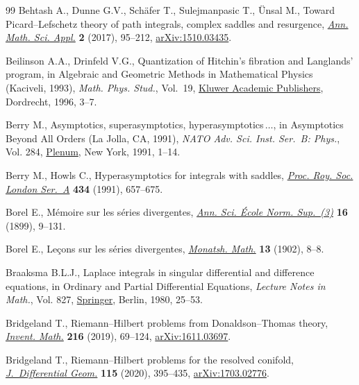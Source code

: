 \begin{thebibliography}{99}
Behtash A., Dunne G.V., Sch\"afer T., Sulejmanpasic T., \"Unsal M., Toward
 {P}icard--{L}efschetz theory of path integrals, complex saddles and
 resurgence, \href{https://doi.org/10.4310/AMSA.2017.v2.n1.a3}{\textit{Ann.
 Math. Sci. Appl.}} \textbf{2} (2017), 95--212,
 \href{http://arxiv.org/abs/1510.03435}{arXiv:1510.03435}.

Beilinson A.A., Drinfeld V.G., Quantization of {H}itchin's fibration and
 {L}anglands' program, in Algebraic and {G}eometric {M}ethods in
 {M}athematical {P}hysics ({K}aciveli, 1993), \textit{Math. Phys. Stud.},
 Vol.~19, \href{https://doi.org/10.1007/978-94-017-0693-3_1}{Kluwer Academic
 Publishers}, Dordrecht, 1996, 3--7.

Berry M., Asymptotics, superasymptotics, hyperasymptotics{$\,\dots$}, in
 Asymptotics {B}eyond {A}ll {O}rders ({L}a {J}olla, {CA}, 1991), \textit{NATO
 Adv. Sci. Inst. Ser.~B: Phys.}, Vol. 284,
 \href{https://doi.org/10.1007/978-1-4757-0435-8_1}{Plenum}, New York, 1991,
 1--14.

Berry M., Howls C., Hyperasymptotics for integrals with saddles,
 \href{https://doi.org/10.1098/rspa.1991.0119}{\textit{Proc. Roy. Soc. London
 Ser.~A}} \textbf{434} (1991), 657--675.

Borel E., M\'emoire sur les s\'eries divergentes,
 \href{https://doi.org/10.24033/asens.463}{\textit{Ann. Sci. \'Ecole Norm.
 Sup.~(3)}} \textbf{16} (1899), 9--131.

Borel E., Le\c{c}ons sur les s\'eries divergentes,
 \href{https://doi.org/10.1007/BF01703288}{\textit{Monatsh. Math.}}
 \textbf{13} (1902), 8--8.

Braaksma B.L.J., Laplace integrals in singular differential and difference
 equations, in Ordinary and {P}artial {D}ifferential {E}quations,
 \textit{Lecture Notes in Math.}, Vol. 827,
 \href{https://doi.org/10.1007/BFb0091373}{Springer}, Berlin, 1980, 25--53.

Bridgeland T., Riemann--{H}ilbert problems from {D}onaldson--{T}homas theory,
 \href{https://doi.org/10.1007/s00222-018-0843-8}{\textit{Invent. Math.}}
 \textbf{216} (2019), 69--124,
 \href{http://arxiv.org/abs/1611.03697}{arXiv:1611.03697}.

Bridgeland T., Riemann--{H}ilbert problems for the resolved conifold,
 \href{https://doi.org/10.4310/jdg/1594260015}{\textit{J.~Differential Geom.}}
 \textbf{115} (2020), 395--435,
 \href{http://arxiv.org/abs/1703.02776}{arXiv:1703.02776}.


\end{thebibliography}
